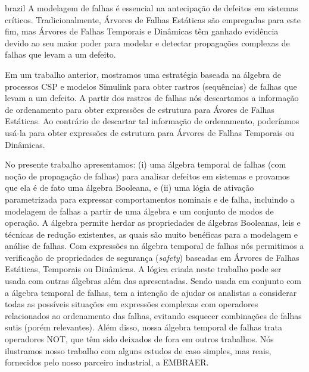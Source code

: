 \documentclass[12pt,openright,twoside,a4paper,oldfontcommands,english,brazil,final]{abntex2}
\theoremstyle{theo}
\begin{document}


\begin{resumo}[Resumo]
\begin{otherlanguage*}{brazil}
A modelagem de falhas é essencial na antecipação de defeitos em sistemas críticos.
Tradicionalmente, Árvores de Falhas Estáticas são empregadas para este fim, mas Árvores de Falhas Temporais e Dinâmicas têm ganhado evidência devido ao seu maior poder para modelar e detectar propagações complexas de falhas que levam a um defeito.

Em um trabalho anterior, mostramos uma estratégia baseada na álgebra de processos CSP e modelos Simulink para obter rastros (sequências) de falhas que levam a um defeito.
A partir dos rastros de falhas nós descartamos a informação de ordenamento para obter expressões de estrutura  para Ávores de Falhas Estáticas.
Ao contrário de descartar tal informação de ordenamento, poderíamos usá-la para obter expressões de estrutura para Árvores de Falhas Temporais ou Dinâmicas.

No presente trabalho apresentamos: (i) uma álgebra temporal de falhas (com noção de propagação de falhas) para analisar defeitos em sistemas e provamos que ela é de fato uma álgebra Booleana, e (ii) uma lógia de ativação parametrizada para expressar comportamentos nominais e de falha, incluindo a modelagem de falhas a partir de uma álgebra e um conjunto de modos de operação.
A álgebra permite herdar as propriedades de álgebras Booleanas, leis e técnicas de redução existentes, as quais são muito benéficas para a modelagem e análise de falhas.
Com expressões na álgebra temporal de falhas nós permitimos a verificação de propriedades de segurança (\emph{safety}) baseadas em Árvores de Falhas Estáticas, Temporais ou Dinâmicas.
A lógica criada neste trabalho pode ser usada com outras álgebras além das apresentadas.
Sendo usada em conjunto com a álgebra temporal de falhas, tem a intenção de ajudar os analistas a considerar todas as possíveis situações em expressões complexas com operadores relacionados ao ordenamento das falhas, evitando esquecer combinações de falhas sutis (porém relevantes).
Além disso, nossa álgebra temporal de falhas trata operadores NOT, que têm sido deixados de fora em outros trabalhos.
Nós ilustramos nosso trabalho com alguns estudos de caso simples, mas reais, fornecidos pelo nosso parceiro industrial, a EMBRAER.


\end{otherlanguage*}
\end{resumo}
\end{document}
